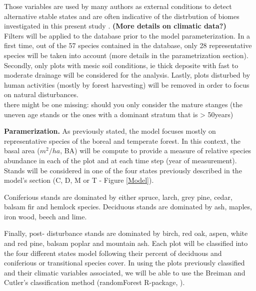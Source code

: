 
Those variables are used by many
authors as external conditions to detect alternative stable states and are
often indicative of the distrbution of biomes investigated in this present
study \cite{Goldblum2010,Hirota2011,Scheffer2012}. \textbf{(More details on
climatic data?)}\\


Filters will be applied to the database prior to the model parameterization.
In a first time, out of the 57 species contained in the  database, only 28
representative species will be taken into account (more details in the
parametrization section). Secondly,  only plots with mesic soil conditions, ie
thick deposite with fast to moderate drainage will be considered for the
analysis. Lastly, plots disturbed by human activities (mostly by forest
harvesting) will be removed in order to focus on natural disturbances. \\ %
there might be one missing: should you only consider the mature stanges (the
uneven age stands or the ones with a dominant stratum that is > 50years)


\textbf{Paramerization.} As previously stated, the model focuses mostly on
representative species of the boreal and temperate forest. In this context, the basal area ($m^2/ha$, BA) will be compute to
provide a measure of relative species abundance in each of the
plot and at each time step (year of measurement). Stands will be considered in one of the four states 
previously described in the model's
section (C, D, M or T - Figure \ref{Model}).


 Coniferious stands are dominated by either spruce, larch, grey pine, cedar,
balsam fir and hemlock species. Deciduous stands are dominated by ash, maples,
iron wood, beech and lime.


Finally, post- disturbance stands are dominated by birch, red oak, aspen,
white and red pine, balsam poplar and mountain ash. Each plot will be
classified into the four different states model following their percent of
deciduous and coniferious or transitional species cover. In using the plots
previously classified and their climatic variables associated, we will be able
to use the Breiman and Cutler's classification method (randomForest R-package,
\cite{Liaw2002a}).

